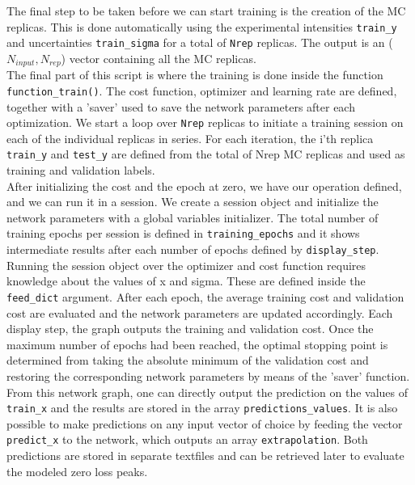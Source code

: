 The final step to be taken before we can start training is the creation of the MC replicas.
%
This is done automatically using the experimental intensities {\tt train\_y} and uncertainties
{\tt train\_sigma} for a total of {\tt Nrep} replicas. The output is an ($N_{input}, N_{rep}$) 
vector containing all the MC replicas. \\

The final part of this script is where the training is done inside the function {\tt function\_train()}. 
%
The cost function, optimizer and learning rate are defined, together with a 'saver' used to 
save the network parameters after each optimization. 
%
We start a loop over {\tt Nrep} replicas to initiate a training session on each of the individual replicas
in series. 
%
For each iteration, the i'th replica {\tt train\_y} and {\tt test\_y} are defined from the total of Nrep 
MC replicas and used as training and validation labels. 
%
\\

After initializing the cost and the epoch at zero, we have our operation defined, and we can run it in a session. 
%
We create a session object and initialize the network parameters with a global variables initializer.
%
The total number of training epochs per session is defined in {\tt training\_epochs} and it shows intermediate 
results after each number of epochs defined by {\tt display\_step}. 
%
Running the session object over the optimizer and cost function requires knowledge about the values of x and sigma. 
These are defined inside the {\tt feed\_dict} argument. 
%
After each epoch, the average training cost and validation cost are evaluated and the network parameters 
are updated accordingly.
%
Each display step, the graph outputs the training and validation cost. 
Once the maximum number of epochs 
had been reached, the optimal stopping point is determined from 
taking the absolute minimum of the validation cost
and restoring the corresponding network parameters by means of the 'saver' function.
%
From this network graph, one can directly output the prediction on the values of {\tt train\_x} and
the results are stored in the array {\tt predictions\_values}.
%
It is also possible to make predictions on any input vector of choice by feeding 
the vector {\tt predict\_x} to the 
network, which outputs an array {\tt extrapolation}.
%
Both predictions are stored in separate textfiles and can be retrieved later to evaluate the modeled zero loss peaks.

